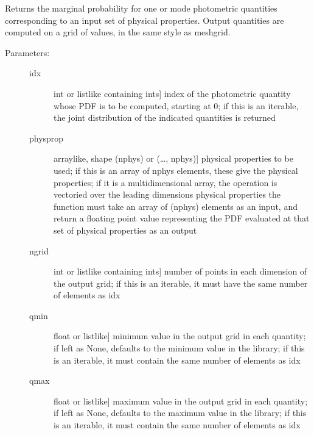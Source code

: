 \documentclass[letterpaper,10pt,english]{sphinxmanual}
\begin{document}
\begin{fulllineitems}
\begin{fulllineitems}
\begin{description}
\begin{description}
\end{description}

\end{description}

\end{fulllineitems}


\begin{fulllineitems}
\label{\detokenize{bayesphot:slugpy.bayesphot.bp.bp.mpdf_phot}}
Returns the marginal probability for one or mode photometric
quantities corresponding to an input set of physical
properties. Output quantities are computed on a grid of
values, in the same style as meshgrid.
\begin{description}
\item[{Parameters:}] \leavevmode\begin{description}
\item[{idx}] \leavevmode{[}int or listlike containing ints{]}
index of the photometric quantity whose PDF is to be
computed, starting at 0; if this is an iterable, the
joint distribution of the indicated quantities is returned

\item[{physprop}] \leavevmode{[}arraylike, shape (nphys) or (…, nphys){]}
physical properties to be used; if this is an array of
nphys elements, these give the physical properties; if
it is a multidimensional array, the operation is
vectoried over the leading dimensions
physical properties \textendash{} the function must take an array
of (nphys) elements as an input, and return a floating
point value representing the PDF evaluated at that set
of physical properties as an output

\item[{ngrid}] \leavevmode{[}int or listlike containing ints{]}
number of points in each dimension of the output grid;
if this is an iterable, it must have the same number of
elements as idx

\item[{qmin}] \leavevmode{[}float or listlike{]}
minimum value in the output grid in each quantity; if
left as None, defaults to the minimum value in the
library; if this is an iterable, it must contain the
same number of elements as idx

\item[{qmax}] \leavevmode{[}float or listlike{]}
maximum value in the output grid in each quantity; if
left as None, defaults to the maximum value in the
library; if this is an iterable, it must contain the
same number of elements as idx


\end{description}
\end{description}
\end{fulllineitems}
\end{fulllineitems}
\end{document}
